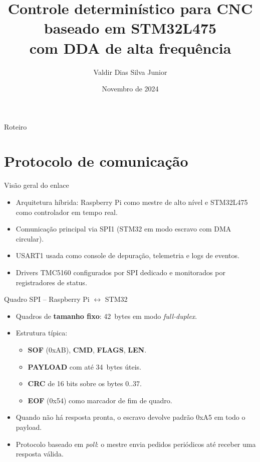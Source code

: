 \documentclass[aspectratio=169]{beamer}
\title[Controle determinístico para CNC]{Controle determinístico para CNC baseado em STM32L475\\com DDA de alta frequência}
\author[Valdir Dias Silva Junior]{Valdir Dias Silva Junior}
\institute{%
  Trabalho de Conclusão de Curso\\[0.2em]
  \small Maceió -- Alagoas
}
\date{Novembro de 2024}
\begin{document}
\begin{frame}[plain]
  \titlepage
\end{frame}

\begin{frame}{Roteiro}
  \tableofcontents
\end{frame}

\section{Protocolo de comunicação}

\begin{frame}{Visão geral do enlace}
  \begin{itemize}
    \item Arquitetura híbrida: Raspberry Pi como mestre de alto nível e STM32L475 como controlador em tempo real.
    \item Comunicação principal via SPI1 (STM32 em modo escravo com DMA circular).
    \item USART1 usada como console de depuração, telemetria e logs de eventos.
    \item Drivers TMC5160 configurados por SPI dedicado e monitorados por registradores de status.
  \end{itemize}
\end{frame}

\begin{frame}{Quadro SPI -- Raspberry Pi $\leftrightarrow$ STM32}
  \begin{itemize}
    \item Quadros de \textbf{tamanho fixo}: 42~bytes em modo \emph{full-duplex}.
    \item Estrutura típica:
      \begin{itemize}
        \item \textbf{SOF} (0xAB), \textbf{CMD}, \textbf{FLAGS}, \textbf{LEN}.
        \item \textbf{PAYLOAD} com até 34~bytes úteis.
        \item \textbf{CRC} de 16 bits sobre os bytes 0..37.
        \item \textbf{EOF} (0x54) como marcador de fim de quadro.
      \end{itemize}
    \item Quando não há resposta pronta, o escravo devolve padrão 0xA5 em todo o payload.
    \item Protocolo baseado em \emph{poll}: o mestre envia pedidos periódicos até receber uma resposta válida.
  \end{itemize}
\end{frame}
\end{document}
